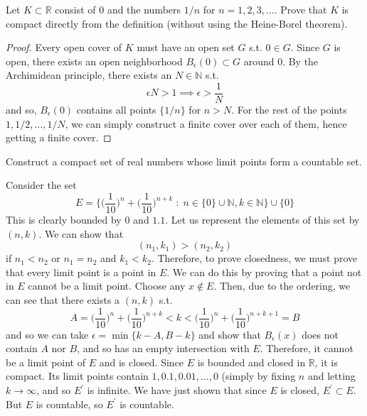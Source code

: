     \begin{exercise}[Rudin 2.12]
    Let $K \subset \mathbb{R}$ consist of $0$ and the numbers $1/n$ for $n = 1, 2, 3, \ldots$. Prove that $K$ is compact directly from the definition (without using the Heine-Borel theorem). 
    \end{exercise}
    \begin{proof}
    Every open cover of $K$ must have an open set $G$ s.t. $0 \in G$. Since $G$ is open, there exists an open neighborhood $B_\epsilon (0) \subset G$ around $0$. By the Archimidean principle, there exists an $N \in \mathbb{N}$ s.t. 
    \[\epsilon N > 1 \implies \epsilon > \frac{1}{N}\]
    and so, $B_\epsilon (0)$ contains all points $\{1/n\}$ for $n > N$. For the rest of the points $1, 1/2, \ldots, 1/N$, we can simply construct a finite cover over each of them, hence getting a finite cover. 
    \end{proof}

    \begin{exercise}[Rudin 2.13]
    Construct a compact set of real numbers whose limit points form a countable set. 
    \end{exercise}
    \begin{solution}
    Consider the set 
    \[E = \bigg\{ \bigg( \frac{1}{10}\bigg)^n + \bigg( \frac{1}{10} \bigg)^{n+k} \; : \; n \in \{0\} \cup \mathbb{N}, k \in \mathbb{N} \bigg\} \cup \{0\}\]
    This is clearly bounded by $0$ and $1.1$. Let us represent the elements of this set by $(n, k)$. We can show that 
    \[(n_1, k_1) > (n_2, k_2)\]
    if $n_1 < n_2$ or $n_1 = n_2$ and $k_1 < k_2$. Therefore, to prove closedness, we must prove that every limit point is a point in $E$. We can do this by proving that a point not in $E$ cannot be a limit point. Choose any $x \not\in E$. Then, due to the ordering, we can see that there exists a $(n, k)$ s.t. 
    \[A = \bigg( \frac{1}{10}\bigg)^n + \bigg( \frac{1}{10} \bigg)^{n+k} < k < \bigg( \frac{1}{10}\bigg)^n + \bigg( \frac{1}{10} \bigg)^{n+k+1} = B\]
    and so we can take $\epsilon = \min\{k - A, B - k\}$ and show that $B_\epsilon (x)$ does not contain $A$ nor $B$, and so has an empty intersection with $E$. Therefore, it cannot be a limit point of $E$ and is closed. Since $E$ is bounded and closed in $\mathbb{R}$, it is compact. Its limit points contain $1, 0.1, 0.01, \ldots, 0$ (simply by fixing $n$ and letting $k \rightarrow \infty$, and so $E^\prime$ is infinite. We have just shown that since $E$ is closed, $E^\prime \subset E$. But $E$ is countable, so $E^\prime$ is countable. 
    \end{solution}

